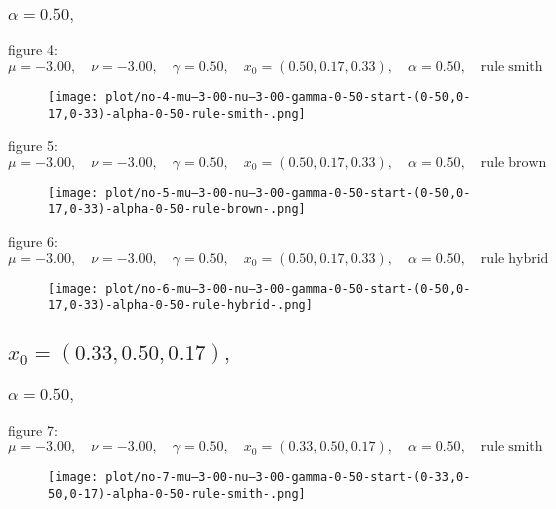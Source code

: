 \documentclass[a4paper]{article}
\begin{document}
\begin{multicols*}{2}
   \subsubsection{\(\alpha = 0.50,\quad \)}
   
figure 4: \(\mu = -3.00,\quad \nu = -3.00,\quad \gamma = 0.50,\quad x_0 = (0.50,0.17,0.33),\quad \alpha = 0.50,\quad \mathrm{rule} \; \mathrm{smith}\)
   \begin{figure}[H]
   \centering
   \texttt{[image: plot/no-4-mu--3-00-nu--3-00-gamma-0-50-start-(0-50,0-17,0-33)-alpha-0-50-rule-smith-.png]}
   \end{figure}
   
figure 5: \(\mu = -3.00,\quad \nu = -3.00,\quad \gamma = 0.50,\quad x_0 = (0.50,0.17,0.33),\quad \alpha = 0.50,\quad \mathrm{rule} \; \mathrm{brown}\)
   \begin{figure}[H]
   \centering
   \texttt{[image: plot/no-5-mu--3-00-nu--3-00-gamma-0-50-start-(0-50,0-17,0-33)-alpha-0-50-rule-brown-.png]}
   \end{figure}
   
figure 6: \(\mu = -3.00,\quad \nu = -3.00,\quad \gamma = 0.50,\quad x_0 = (0.50,0.17,0.33),\quad \alpha = 0.50,\quad \mathrm{rule} \; \mathrm{hybrid}\)
   \begin{figure}[H]
   \centering
   \texttt{[image: plot/no-6-mu--3-00-nu--3-00-gamma-0-50-start-(0-50,0-17,0-33)-alpha-0-50-rule-hybrid-.png]}
   \end{figure}
   

   \subsection{\(x_0 = (0.33,0.50,0.17),\quad \)}
   

   \subsubsection{\(\alpha = 0.50,\quad \)}
   
figure 7: \(\mu = -3.00,\quad \nu = -3.00,\quad \gamma = 0.50,\quad x_0 = (0.33,0.50,0.17),\quad \alpha = 0.50,\quad \mathrm{rule} \; \mathrm{smith}\)
   \begin{figure}[H]
   \centering
   \texttt{[image: plot/no-7-mu--3-00-nu--3-00-gamma-0-50-start-(0-33,0-50,0-17)-alpha-0-50-rule-smith-.png]}
   \end{figure}
   

\end{multicols*}
\end{document}
